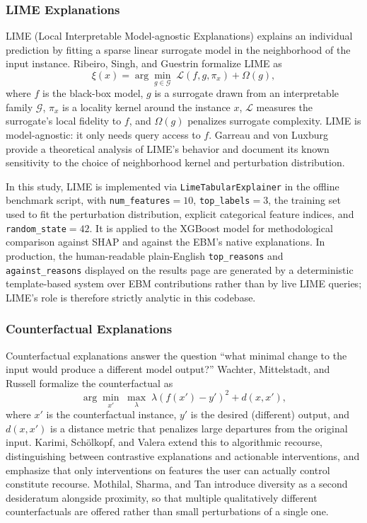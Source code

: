 \documentclass[journal]{./IEEE/IEEEtran}
\begin{document}
\subsubsection{LIME Explanations}

LIME (Local Interpretable Model-agnostic Explanations) explains an individual prediction by fitting a sparse linear surrogate model in the neighborhood of the input instance. Ribeiro, Singh, and Guestrin \cite{ref19} formalize LIME as
\begin{equation*}
    \xi(x) = \arg\min_{g \in \mathcal{G}}\; \mathcal{L}(f, g, \pi_x) + \Omega(g),
\end{equation*}
where $f$ is the black-box model, $g$ is a surrogate drawn from an interpretable family $\mathcal{G}$, $\pi_x$ is a locality kernel around the instance $x$, $\mathcal{L}$ measures the surrogate's local fidelity to $f$, and $\Omega(g)$ penalizes surrogate complexity. LIME is model-agnostic: it only needs query access to $f$. Garreau and von Luxburg \cite{ref71} provide a theoretical analysis of LIME's behavior and document its known sensitivity to the choice of neighborhood kernel and perturbation distribution.

In this study, LIME is implemented via \texttt{LimeTabularExplainer} in the offline benchmark script, with \texttt{num\_features}$=10$, \texttt{top\_labels}$=3$, the training set used to fit the perturbation distribution, explicit categorical feature indices, and \texttt{random\_state}$=42$. It is applied to the XGBoost model for methodological comparison against SHAP and against the EBM's native explanations. In production, the human-readable plain-English \texttt{top\_reasons} and \texttt{against\_reasons} displayed on the results page are generated by a deterministic template-based system over EBM contributions rather than by live LIME queries; LIME's role is therefore strictly analytic in this codebase.

\subsubsection{Counterfactual Explanations}

Counterfactual explanations answer the question ``what minimal change to the input would produce a different model output?'' Wachter, Mittelstadt, and Russell \cite{ref20} formalize the counterfactual as
\begin{equation*}
    \arg\min_{x'}\;\max_\lambda\; \lambda (f(x') - y')^2 + d(x, x'),
\end{equation*}
where $x'$ is the counterfactual instance, $y'$ is the desired (different) output, and $d(x, x')$ is a distance metric that penalizes large departures from the original input. Karimi, Sch\"olkopf, and Valera \cite{ref72} extend this to algorithmic recourse, distinguishing between contrastive explanations and actionable interventions, and emphasize that only interventions on features the user can actually control constitute recourse. Mothilal, Sharma, and Tan \cite{ref73} introduce diversity as a second desideratum alongside proximity, so that multiple qualitatively different counterfactuals are offered rather than small perturbations of a single one.
\end{document}
